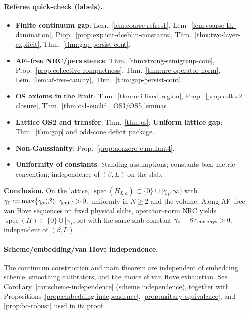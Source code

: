 \documentclass[11pt]{amsart}
\theoremstyle{plain}
\theoremstyle{definition}
\theoremstyle{remark}
\begin{document}
\begin{center}
{{\paragraph{Referee quick-check (labels).}
\begin{itemize}
  \item \textbf{Finite continuum gap}: Lem.~\ref{lem:coarse-refresh}, Lem.~\ref{lem:coarse-hk-domination}, Prop.~\ref{prop:explicit-doeblin-constants}, Thm.~\ref{thm:two-layer-explicit}, Thm.~\ref{thm:gap-persist-cont}.
  \item \textbf{AF--free NRC/persistence}: Thm.~\ref{thm:strong-semigroup-core}, Prop.~\ref{prop:collective-compactness}, Thm.~\ref{thm:nrc-operator-norm}, Lem.~\ref{lem:af-free-cauchy}, Thm.~\ref{thm:gap-persist-cont}.
  \item \textbf{OS axioms in the limit}: Thm.~\ref{thm:uei-fixed-region}, Prop.~\ref{prop:os0os2-closure}, Thm.~\ref{thm:os1-euclid}, OS3/OS5 lemmas.
  \item \textbf{Lattice OS2 and transfer}: Thm.~\ref{thm:os}; \textbf{Uniform lattice gap}: Thm.~\ref{thm:gap} and odd-cone deficit package.
  \item \textbf{Non-Gaussianity}: Prop.~\ref{prop:nonzero-cumulant4}.
  \item \textbf{Uniformity of constants}: Standing assumptions; constants box; metric convention; independence of $(\beta,L)$ on the slab.
\end{itemize}
\smallskip
\textbf{Conclusion.} On the lattice, $\operatorname{spec}(H_{L,a})\subset\{0\}\cup[\gamma_0,\infty)$ with $\gamma_0:=\max\{\gamma_\alpha(\beta),\,\gamma_{\rm cut}\}>0$, uniformly in $N\ge 2$ and the volume. Along AF--free van Hove sequences on fixed physical slabs, operator--norm NRC yields $\operatorname{spec}(H)\subset\{0\}\cup[\gamma_*,\infty)$ with the same slab constant $\gamma_* = 8\,c_{\rm cut,phys}>0$, independent of $(\beta,L)$.
}}
\end{center}

\paragraph{Scheme/embedding/van Hove independence.}
The continuum construction and main theorem are independent of embedding scheme, smoothing calibrators, and the choice of van Hove exhaustion. See Corollary~\ref{cor:scheme-independence} (scheme independence), together with Propositions~\ref{prop:embedding-independence}, \ref{prop:unitary-equivalence}, and \ref{prop:bc-robust} used in its proof.
\end{document}
